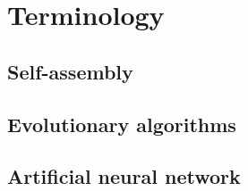 \section{Terminology}
\subsection{Self-assembly}
\subsection{Evolutionary algorithms}
\subsection{Artificial neural network}